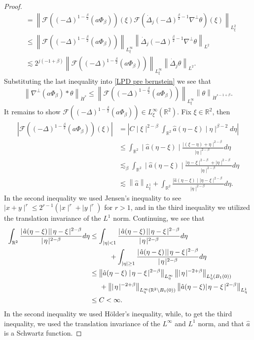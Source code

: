 \documentclass[12pt,xcolor=svgnames]{amsart}
\newcommand{\R}{\mathbb{R}}
\newcommand{\abs}[1]{\mid\!#1\!\mid}
\newcommand{\norm}[2]{\left\lVert#1\right\rVert_{#2}}
\begin{document}
\begin{proof}
\begin{align*}
&=
\norm{\mathcal{F}\left((-\Delta)^{1-\frac{\beta}{2}}(a\Phi_{\beta})\right)(\xi)\mathcal{F}\left(\dot{\Delta}_j(-\Delta)^{\frac{\beta}{2}-1}\nabla^{\perp}\theta\right)(\xi)}{L_{\xi}^2} \\
&\leq
\norm{\mathcal{F}\left((-\Delta)^{1-\frac{\beta}{2}}(a\Phi_{\beta})\right)}{L_{\xi}^{\infty}}\norm{\dot{\Delta}_j(-\Delta)^{\frac{\beta}{2}-1}\nabla^{\perp}\theta}{L^2} \\
&\lesssim 2^{j(-1+\beta)}\norm{\mathcal{F}\left((-\Delta)^{1-\frac{\beta}{2}}(a\Phi_{\beta})\right)}{L_{\xi}^{\infty}}\norm{\dot{\Delta}_j\theta}{L^2}.
\end{align*}
Substituting the last inequality into \eqref{LPD pre bernstein} we see that 
$$
\norm{\nabla^{\perp}(a\Phi_{\beta})\ast\theta}{\dot{H}^s} \leq \norm{\mathcal{F}\left((-\Delta)^{1-\frac{\beta}{2}}(a\Phi_{\beta})\right)}{L_{\xi}^{\infty}} \norm{\theta}{\dot{H}^{s-1+\beta}}.
$$
It remains to show $\mathcal{F}\left((-\Delta)^{1-\frac{\beta}{2}}(a\Phi_{\beta})\right) \in L_{\xi}^{\infty}(\R^2)$. Fix $\xi \in \R^2$, then 
\begin{align*}
\left|\mathcal{F}\left((-\Delta)^{1-\frac{\beta}{2}}(a\Phi_{\beta})\right)(\xi)\right|&= \left| C\abs{\xi}^{2-\beta}\int_{\R^2}\hat{a}(\eta-\xi)\abs{\eta}^{\beta-2}d\eta \right| \\
&\leq \int_{\R^2} \abs{\hat{a}(\eta-\xi)}\frac{\abs{(\xi-\eta)+\eta}^{2-\beta}}{\abs{\eta}^{2-\beta}}d\eta \\
&\lesssim_{\beta} \int_{\R^2}\abs{\hat{a}(\eta-\xi)}\frac{\abs{\eta-\xi}^{2-\beta}+\abs{\eta}^{2-\beta}}{\abs{\eta}^{2-\beta}}d\eta\\
&\lesssim 
\norm{\hat{a}}{L_{\xi}^1} + \int_{\R^2}\frac{\abs{\hat{a}(\eta-\xi)}\abs{\eta-\xi}^{2-\beta}}{\abs{\eta}^{2-\beta}}d\eta.
\end{align*}
In the second inequality we used Jensen's inequality to see $\abs{x+y}^r \leq 2^{r-1}\left(\abs{x}^r+\abs{y}^r\right)$ for $r>1$, and in the third inequality we utilized the  translation invariance of the $L^1$ norm. Continuing, we see that 
\begin{align*}
\int_{\R^2}\frac{\abs{\hat{a}(\eta-\xi)}\abs{\eta-\xi}^{2-\beta}}{\abs{\eta}^{2-\beta}}d\eta &\leq
\int_{|\eta|< 1}\frac{\abs{\hat{a}(\eta-\xi)}\abs{\eta-\xi}^{2-\beta}}{\abs{\eta}^{2-\beta}}d\eta\\ &\hspace{1cm} + \int_{|\eta| \geq 1}\frac{\abs{\hat{a}(\eta-\xi)}\abs{\eta-\xi}^{2-\beta}}{\abs{\eta}^{2-\beta}}d\eta\\
&\leq
\norm{\hat{a}(\eta-\xi)\abs{\eta-\xi}^{2-\beta}}{L_{\eta}^{\infty}}\norm{\abs{\eta}^{-2+\beta}}{L_{\eta}^1(B_1(0))} \\ &\hspace{.5cm}+ \norm{\abs{\eta}^{-2+\beta}}{L_{\eta}^{\infty}(\R^2\setminus B_1(0))}\norm{\hat{a}(\eta-\xi){\abs{\eta-\xi}^{2-\beta}}}{L_{\eta}^1}\\&\leq C<\infty.
\end{align*}
In the second inequality we used Hölder's inequality, while, to get the third inequality, we used the translation invariance of the $L^{\infty}$ and $L^1$ norm, and that $\hat{a}$ is a Schwartz function.
\end{proof}
\end{document}
